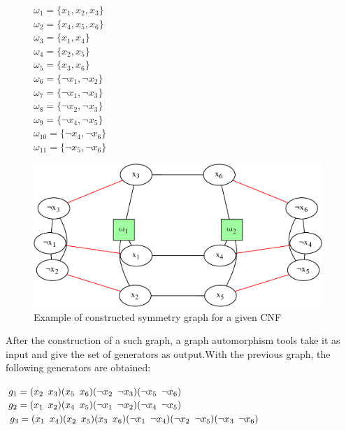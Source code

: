 \begin{figure}[!htbp]
 \begin{minipage}[r]{.2\textwidth}
   $\omega_{1} = \{ x_{1}, x_{2}, x_{3} \}$ \\
 $\omega_{2} = \{ x_{4}, x_{5}, x_{6} \}$ \\
 $\omega_{3} = \{ x_{1}, x_{4} \}$ \\
 $\omega_{4} = \{ x_{2}, x_{5} \}$ \\
 $\omega_{5} = \{ x_{3}, x_{6} \}$ \\
 $\omega_{6} = \{ \neg x_{1}, \neg x_{2} \}$ \\
 $\omega_{7} = \{ \neg x_{1}, \neg x_{3} \}$ \\
 $\omega_{8} = \{ \neg x_{2}, \neg x_{3} \}$ \\
 $\omega_{9} = \{ \neg x_{4}, \neg x_{5} \}$ \\
 $\omega_{10} = \{ \neg x_{4}, \neg x_{6} \}$ \\
 $\omega_{11} = \{ \neg x_{5}, \neg x_{6} \}$ \\
 \end{minipage}
 \begin{minipage}[r]{.75\textwidth}
  \includegraphics[width=4.3in]{cnfs/graph_cnf_opt-crop}
 \end{minipage}
 \caption{Example of constructed symmetry graph for a given CNF}
  \label{fig:graph_opt}
\end{figure}


After the construction of a such graph, a graph automorphism tools take it as input and give
the set of generators as output.With the previous graph, the following generators are obtained:


\begin{center}
 \begin{minipage}[c]{.635\textwidth}
  $g_1 = (x_2 \enskip x_3)(x_5 \enskip x_6)(\neg x_2 \enskip \neg x_3)(\neg x_5 \enskip \neg x_6)$\\
  $g_2 = (x_1 \enskip x_2)(x_4 \enskip x_5)(\neg x_1 \enskip \neg x_2)(\neg x_4 \enskip \neg x_5)$\\
  $g_3 = (x_1 \enskip x_4)(x_2 \enskip x_5)(x_3 \enskip x_6)(\neg x_1 \enskip \neg x_4)(\neg x_2 \enskip \neg x_5)(\neg x_3 \enskip \neg x_6)$
 \end{minipage}
\end{center}

